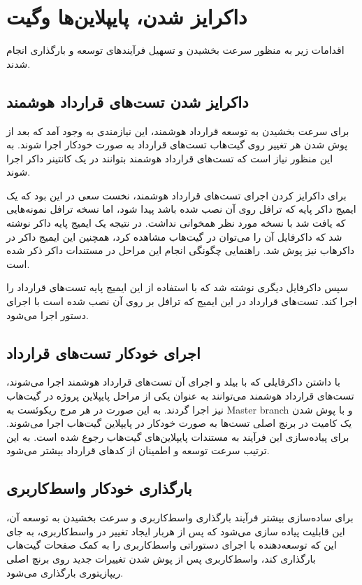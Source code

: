 \section{داکرایز شدن، پایپلاین‌ها وگیت}
اقدامات زیر به منظور سرعت بخشیدن و تسهیل فرآیندهای توسعه و بارگذاری انجام شدند.

\subsection{داکرایز شدن تست‌های قرارداد هوشمند}
برای سرعت بخشیدن به توسعه قرارداد هوشمند،
این نیازمندی به وجود آمد که بعد از پوش شدن هر تغییر روی گیت‌هاب تست‌های قرارداد به صورت خودکار اجرا شوند.
به این منظور نیاز است که تست‌های قرارداد هوشمند بتوانند در یک کانتینر داکر اجرا شوند.

برای داکرایز کردن اجرای تست‌های قرارداد هوشمند،
نخست سعی در این بود که یک ایمیج داکر پایه که ترافل روی آن نصب شده باشد پیدا شود،
اما نسخه ترافل نمونه‌هایی که یافت شد با نسخه مورد نظر همخوانی نداشت.
در نتیجه یک ایمیج پایه داکر نوشته شد که داکرفایل آن را می‌توان در گیت‌هاب
مشاهده کرد، همچنین این ایمیج داکر در داکرهاب
نیز پوش شد.
راهنمایی چگونگی انجام این مراحل در مستندات داکر
\cite{DockerDocs}
ذکر شده است.

سپس داکرفایل دیگری نوشته شد که با استفاده از این ایمیج پایه تست‌های قرارداد را اجرا کند.
تست‌های قرارداد در این ایمیج که ترافل بر روی آن نصب شده است با اجرای دستور
اجرا می‌شود.


\subsection{اجرای خودکار تست‌های قرارداد}
با داشتن داکرفایلی که با بیلد و اجرای آن تست‌های قرارداد هوشمند اجرا می‌شوند،
تست‌های قرارداد هوشمند می‌توانند به عنوان یکی از مراحل پایپلاین پروژه در گیت‌هاب نیز اجرا گردند.
به این صورت در هر مرج ریکوئست به
\gls{Master branch}
و با پوش شدن یک کامیت در برنچ اصلی تست‌ها به صورت خودکار در پایپلاین گیت‌هاب اجرا می‌شوند.
برای پیاده‌سازی این فرآیند به مستندات پایپلاین‌های گیت‌هاب
\cite{GithubActions}
رجوع شده است.
به این ترتیب سرعت توسعه و اطمینان از کدهای قرارداد بیشتر می‌شود.


\subsection{بارگذاری خودکار واسط‌کاربری}
برای ساده‌سازی بیشتر فرآیند بارگذاری واسط‌کاربری و سرعت بخشیدن به توسعه آن،
این قابلیت پیاده سازی می‌شود که پس از هربار ایجاد تغییر در واسط‌کاربری،
به جای این که توسعه‌دهنده با اجرای دستوراتی واسط‌کاربری را به کمک صفحات گیت‌هاب بارگذاری کند،
واسط‌کاربری پس از پوش شدن تغییرات جدید روی برنچ اصلی ریپازیتوری بارگذاری می‌شود.

